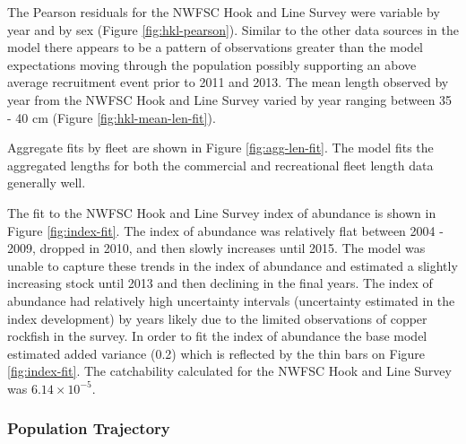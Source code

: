 \documentclass[11pt,
  english,
  a4paper,
]{article}
\begin{document}
\leavevmode\tagmcend\tagstructend\par


The Pearson residuals for the NWFSC Hook and Line Survey were variable by year and by sex (Figure \ref{fig:hkl-pearson}). Similar to the other data sources in the model there appears to be a pattern of observations greater than the model expectations moving through the population possibly supporting an above average recruitment event prior to 2011 and 2013. The mean length observed by year from the NWFSC Hook and Line Survey varied by year ranging between 35 - 40 cm (Figure \ref{fig:hkl-mean-len-fit}).

\leavevmode\tagmcend\tagstructend\par


Aggregate fits by fleet are shown in Figure \ref{fig:agg-len-fit}. The model fits the aggregated lengths for both the commercial and recreational fleet length data generally well.

\leavevmode\tagmcend\tagstructend\par


The fit to the NWFSC Hook and Line Survey index of abundance is shown in Figure \ref{fig:index-fit}. The index of abundance was relatively flat between 2004 - 2009, dropped in 2010, and then slowly increases until 2015. The model was unable to capture these trends in the index of abundance and estimated a slightly increasing stock until 2013 and then declining in the final years. The index of abundance had relatively high uncertainty intervals (uncertainty estimated in the index development) by years likely due to the limited observations of copper rockfish in the survey. In order to fit the index of abundance the base model estimated added variance (0.2) which is reflected by the thin bars on Figure \ref{fig:index-fit}. The catchability calculated for the NWFSC Hook and Line Survey was \ensuremath{6.14\times 10^{-5}}.

\leavevmode\tagmcend\tagstructend\par


\hypertarget{population-trajectory}{%
\subsubsection{Population Trajectory}\label{population-trajectory}}
\end{document}

